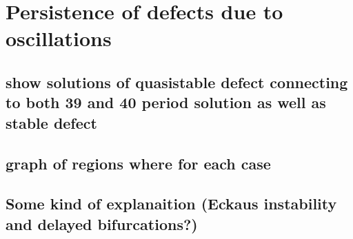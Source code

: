 \documentclass[../main/TimeForcingSHE.tex]{subfiles}
\begin{document}
\section{Persistence of defects due to oscillations}
\subsection{show solutions of quasistable defect connecting to both 39 and 40 period solution as well as stable defect}
\subsection{graph of regions where for each case}
\subsection{Some kind of explanaition (Eckaus instability and delayed bifurcations?)}
\end{document}
